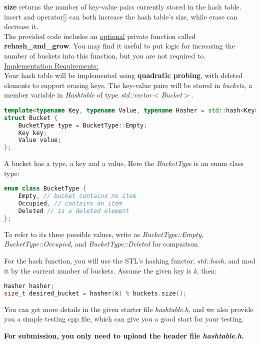 \documentclass[11pt]{exam}
\begin{document}
\textbf{size} returns the number of key-value pairs currently stored in the hash table. insert and operator[] can both increase the hash table’s size, while erase can decrease it.\\

The provided code includes an \underline{optional} private function called \textbf{rehash\_and\_grow}. You may find it useful to put logic for increasing the number of buckets into this function, but you are not required to.\\

\underline{Implementation Requirements:}\\

Your hash table will be implemented using \textbf{quadratic probing}, with deleted elements to support erasing keys. The key-value pairs will be stored in \textit{buckets}, a member variable in \textit{Hashtable} of type \textit{std::vector$<$Bucket$>$}.

\begin{lstlisting}[language=c++]
template<typename Key, typename Value, typename Hasher = std::hash<Key>>
struct Bucket {
	BucketType type = BucketType::Empty;
	Key key;
	Value value;
};
\end{lstlisting}

A bucket has a type, a key and a value. Here the \textit{BucketType} is an enum class type:
\begin{lstlisting}[language=c++]
enum class BucketType {
	Empty, // bucket contains no item
	Occupied, // contains an item
	Deleted // is a deleted element
};
\end{lstlisting}

To refer to its three possible values, write as \textit{BucketType::Empty, BucketType::Occupied}, and \textit{BucketType::Deleted} for comparison.

For the hash function, you will use the STL's hashing functor, \textit{std::hash}, and mod it by the current number of buckets. Assume the given key is \textit{k}, then:
\begin{lstlisting}[language=c++]
Hasher hasher;
size_t desired_bucket = hasher(k) % buckets.size();
\end{lstlisting}

You can get more details in the given starter file \textit{hashtable.h}, and we also provide you a simple testing cpp file, which can give you a good start for your testing.

\textbf{For submission, you only need to upload the header file \textit{hashtable.h}.}
\end{document}
